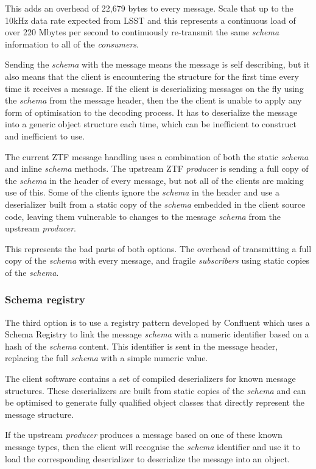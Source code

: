 \documentclass{article}
\newcommand{\kfconsumers} {\textit{consumers}\xspace}
\newcommand{\kfproducer} {\textit{producer}\xspace}
\newcommand{\kfsubscribers} {\textit{subscribers}\xspace}
\newcommand{\confluent} {Confluent\xspace}
\newcommand{\avschema} {\textit{schema}\xspace}
\newcommand{\conschemareg} {registry\xspace}
\newcommand{\conschemaregistry} {Schema Registry\xspace}
\newcommand{\deserz}    {deserialize\xspace}
\newcommand{\deserzer}  {deserializer\xspace}
\newcommand{\deserzers} {deserializers\xspace}
\newcommand{\deserzing} {deserializing\xspace}
\begin{document}
This adds an overhead of 22,679 bytes to every message. Scale that up to the 10kHz data rate expected from LSST and this represents a continuous load of over 220 Mbytes per second to continuously re-transmit the same \avschema information to all of the \kfconsumers.

Sending the \avschema with the message means the message is self describing, but it also means that the client is encountering the structure for the first time every time it receives a message. If the client is \deserzing messages on the fly using the \avschema from the message header, then the the client is unable to apply any form of optimisation to the decoding process. It has to \deserz the message into a generic object structure each time, which can be inefficient to construct and inefficient to use.

The current ZTF message handling uses a combination of both the static \avschema and inline \avschema methods.
The upstream ZTF \kfproducer is sending a full copy of the \avschema in the header of every message, but not all of the clients are making use of this. 
Some of the clients ignore the \avschema in the header and use a \deserzer built from a static copy of the \avschema embedded in the client source code, leaving them vulnerable to changes to the message \avschema from the upstream \kfproducer.

This represents the bad parts of both options. The overhead of transmitting a full copy of the \avschema with every message, and fragile \kfsubscribers using static copies of the \avschema.

\subsubsection{Schema registry}
\label{avro-schema-registry}

The third option is to use a \conschemareg pattern developed by \confluent which uses a \conschemaregistry to link the message \avschema with a numeric identifier based on a hash of the \avschema content.
This identifier is sent in the message header, replacing the full \avschema with a simple numeric value.

The client software contains a set of compiled \deserzers for known message structures.
These \deserzers are built from static copies of the \avschema and can be optimised to generate fully qualified object classes that directly represent the message structure.

If the upstream \kfproducer produces a message based on one of these known message types, then the client will recognise the \avschema identifier and use it to load the corresponding \deserzer to \deserz the message into an object.
\end{document}
